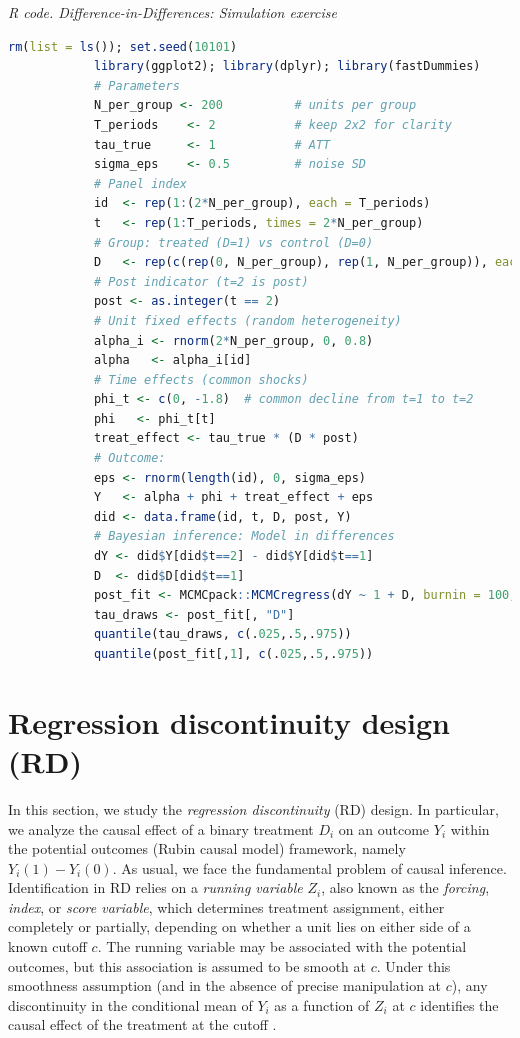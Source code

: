\begin{tcolorbox}[enhanced,width=4.67in,center upper,
	fontupper=\large\bfseries,drop shadow southwest,sharp corners]
	\textit{R code. Difference-in-Differences: Simulation exercise}
	\begin{VF}
		\begin{lstlisting}[language=R]		
			rm(list = ls()); set.seed(10101)
			library(ggplot2); library(dplyr); library(fastDummies)
			# Parameters
			N_per_group <- 200          # units per group
			T_periods    <- 2           # keep 2x2 for clarity
			tau_true     <- 1           # ATT
			sigma_eps    <- 0.5         # noise SD
			# Panel index
			id  <- rep(1:(2*N_per_group), each = T_periods)
			t   <- rep(1:T_periods, times = 2*N_per_group)
			# Group: treated (D=1) vs control (D=0)
			D   <- rep(c(rep(0, N_per_group), rep(1, N_per_group)), each = T_periods)
			# Post indicator (t=2 is post)
			post <- as.integer(t == 2)
			# Unit fixed effects (random heterogeneity)
			alpha_i <- rnorm(2*N_per_group, 0, 0.8)
			alpha   <- alpha_i[id]
			# Time effects (common shocks)
			phi_t <- c(0, -1.8)  # common decline from t=1 to t=2
			phi   <- phi_t[t]
			treat_effect <- tau_true * (D * post)
			# Outcome:
			eps <- rnorm(length(id), 0, sigma_eps)
			Y   <- alpha + phi + treat_effect + eps
			did <- data.frame(id, t, D, post, Y)
			# Bayesian inference: Model in differences
			dY <- did$Y[did$t==2] - did$Y[did$t==1]
			D  <- did$D[did$t==1]
			post_fit <- MCMCpack::MCMCregress(dY ~ 1 + D, burnin = 100, mcmc = 1000)
			tau_draws <- post_fit[, "D"]
			quantile(tau_draws, c(.025,.5,.975))
			quantile(post_fit[,1], c(.025,.5,.975))
		\end{lstlisting}
	\end{VF}
\end{tcolorbox}  

\section{Regression discontinuity design (RD)}\label{chap12_7}

In this section, we study the \textit{regression discontinuity} (RD) design. In particular, we analyze the causal effect of a binary treatment $D_i$ on an outcome $Y_i$ within the potential outcomes (Rubin causal model) framework, namely $Y_i(1)-Y_i(0)$. As usual, we face the fundamental problem of causal inference. Identification in RD relies on a \textit{running variable} $Z_i$, also known as the \textit{forcing}, \textit{index}, or \textit{score variable}, which determines treatment assignment, either completely or partially, depending on whether a unit lies on either side of a known cutoff $c$. The running variable may be associated with the potential outcomes, but this association is assumed to be smooth at $c$. Under this smoothness assumption (and in the absence of precise manipulation at $c$), any discontinuity in the conditional mean of $Y_i$ as a function of $Z_i$ at $c$ identifies the causal effect of the treatment at the cutoff \cite{imbens2008regression}.

